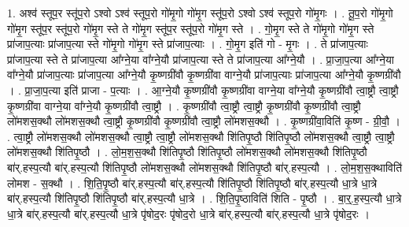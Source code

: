 \documentclass[17pt]{extarticle}
\begin{document}
1. अश्व॑ स्तूप॒र स्तू॑प॒रो ऽश्वो ऽश्व॑ स्तूप॒रो गो॑मृ॒गो गो॑मृ॒ग स्तू॑प॒रो ऽश्वो ऽश्व॑ स्तूप॒रो गो॑मृ॒गः । . तू॒प॒रो गो॑मृ॒गो गो॑मृ॒ग स्तू॑प॒र स्तू॑प॒रो गो॑मृ॒ग स्ते ते गो॑मृ॒ग स्तू॑प॒र स्तू॑प॒रो गो॑मृ॒ग स्ते । . गो॒मृ॒ग स्ते ते गो॑मृ॒गो गो॑मृ॒ग स्ते प्रा॑जाप॒त्याः प्रा॑जाप॒त्या स्ते गो॑मृ॒गो गो॑मृ॒ग स्ते प्रा॑जाप॒त्याः । . गो॒मृ॒ग इति॑ गो - मृ॒गः । . ते प्रा॑जाप॒त्याः प्रा॑जाप॒त्या स्ते ते प्रा॑जाप॒त्या आ᳚ग्ने॒या वा᳚ग्ने॒यौ प्रा॑जाप॒त्या स्ते ते प्रा॑जाप॒त्या आ᳚ग्ने॒यौ । . प्रा॒जा॒प॒त्या आ᳚ग्ने॒या वा᳚ग्ने॒यौ प्रा॑जाप॒त्याः प्रा॑जाप॒त्या आ᳚ग्ने॒यौ कृ॒ष्णग्री॑वौ कृ॒ष्णग्री॑वा वाग्ने॒यौ प्रा॑जाप॒त्याः प्रा॑जाप॒त्या आ᳚ग्ने॒यौ कृ॒ष्णग्री॑वौ । . प्रा॒जा॒प॒त्या इति॑ प्राजा - प॒त्याः । . आ॒ग्ने॒यौ कृ॒ष्णग्री॑वौ कृ॒ष्णग्री॑वा वाग्ने॒या वा᳚ग्ने॒यौ कृ॒ष्णग्री॑वौ त्वा॒ष्ट्रौ त्वा॒ष्ट्रौ कृ॒ष्णग्री॑वा वाग्ने॒या वा᳚ग्ने॒यौ कृ॒ष्णग्री॑वौ त्वा॒ष्ट्रौ । . कृ॒ष्णग्री॑वौ त्वा॒ष्ट्रौ त्वा॒ष्ट्रौ कृ॒ष्णग्री॑वौ कृ॒ष्णग्री॑वौ त्वा॒ष्ट्रौ लो॑मशस॒क्थौ लो॑मशस॒क्थौ त्वा॒ष्ट्रौ कृ॒ष्णग्री॑वौ कृ॒ष्णग्री॑वौ त्वा॒ष्ट्रौ लो॑मशस॒क्थौ । . कृ॒ष्णग्री॑वा॒विति॑ कृ॒ष्ण - ग्री॒वौ॒ । . त्वा॒ष्ट्रौ लो॑मशस॒क्थौ लो॑मशस॒क्थौ त्वा॒ष्ट्रौ त्वा॒ष्ट्रौ लो॑मशस॒क्थौ शि॑तिपृ॒ष्ठौ शि॑तिपृ॒ष्ठौ लो॑मशस॒क्थौ त्वा॒ष्ट्रौ त्वा॒ष्ट्रौ लो॑मशस॒क्थौ शि॑तिपृ॒ष्ठौ । . लो॒म॒श॒स॒क्थौ शि॑तिपृ॒ष्ठौ शि॑तिपृ॒ष्ठौ लो॑मशस॒क्थौ लो॑मशस॒क्थौ शि॑तिपृ॒ष्ठौ बा॑र्.हस्प॒त्यौ बा॑र्.हस्प॒त्यौ शि॑तिपृ॒ष्ठौ लो॑मशस॒क्थौ लो॑मशस॒क्थौ शि॑तिपृ॒ष्ठौ बा॑र्.हस्प॒त्यौ । . लो॒म॒श॒स॒क्थाविति॑ लोमश - स॒क्थौ । . शि॒ति॒पृ॒ष्ठौ बा॑र्.हस्प॒त्यौ बा॑र्.हस्प॒त्यौ शि॑तिपृ॒ष्ठौ शि॑तिपृ॒ष्ठौ बा॑र्.हस्प॒त्यौ धा॒त्रे धा॒त्रे बा॑र्.हस्प॒त्यौ शि॑तिपृ॒ष्ठौ शि॑तिपृ॒ष्ठौ बा॑र्.हस्प॒त्यौ धा॒त्रे । . शि॒ति॒पृ॒ष्ठाविति॑ शिति - पृ॒ष्ठौ । . बा॒र्॒.ह॒स्प॒त्यौ धा॒त्रे धा॒त्रे बा॑र्.हस्प॒त्यौ बा॑र्.हस्प॒त्यौ धा॒त्रे पृ॑षोद॒रः पृ॑षोद॒रो धा॒त्रे बा॑र्.हस्प॒त्यौ बा॑र्.हस्प॒त्यौ धा॒त्रे पृ॑षोद॒रः । \newline
\end{document}
